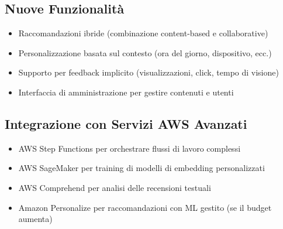 \documentclass[11pt,a4paper]{article}
\begin{document}
\subsection{Nuove Funzionalità}
\begin{itemize}
  \item Raccomandazioni ibride (combinazione content-based e collaborative)
  \item Personalizzazione basata sul contesto (ora del giorno, dispositivo, ecc.)
  \item Supporto per feedback implicito (visualizzazioni, click, tempo di visione)
  \item Interfaccia di amministrazione per gestire contenuti e utenti
\end{itemize}

\subsection{Integrazione con Servizi AWS Avanzati}
\begin{itemize}
  \item AWS Step Functions per orchestrare flussi di lavoro complessi
  \item AWS SageMaker per training di modelli di embedding personalizzati
  \item AWS Comprehend per analisi delle recensioni testuali
  \item Amazon Personalize per raccomandazioni con ML gestito (se il budget aumenta)
\end{itemize}
\end{document}

